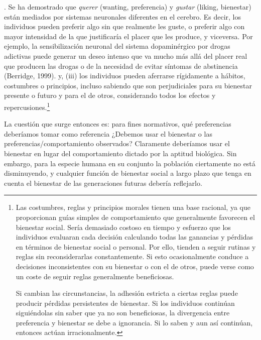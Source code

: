 \documentclass[10pt,a4paper]{article}
\newcounter{numitem}
\newenvironment{lnum}
      {\begin{list}{\arabic{numitem}.}{%
          \usecounter{numitem}%
          \setlength{\leftmargin}{1cm}%
          \setlength{\parskip}{3pt}%
          \setlength{\itemsep}{0pt}%
          \setlength{\parsep}{0pt}%
      }}
      {\end{list}}
\begin{document}
\begin{lnum}
{    Se ha demostrado que \textit{querer} (wanting, preferencia) y \textit{gustar} (liking, bienestar) están mediados por sistemas neuronales diferentes en el cerebro. Es decir, los individuos pueden preferir algo sin que realmente les guste, o preferir algo con mayor intensidad de la que justificaría el placer que les produce, y viceversa. Por ejemplo, la sensibilización neuronal del sistema dopaminérgico por drogas adictivas puede generar un deseo intenso que va mucho más allá del placer real que producen las drogas o de la necesidad de evitar síntomas de abstinencia (Berridge, 1999).
    } y, (iii) los individuos pueden aferrarse rígidamente a hábitos, costumbres o principios, incluso sabiendo que son perjudiciales para su bienestar presente o futuro y para el de otros, considerando todos los efectos y repercusiones.\footnote{%
        Las costumbres, reglas y principios morales tienen una base racional, ya que proporcionan guías simples de comportamiento que generalmente favorecen el bienestar social. Sería demasiado costoso en tiempo y esfuerzo que los individuos evaluaran cada decisión calculando todas las ganancias y pérdidas en términos de bienestar social o personal. Por ello, tienden a seguir rutinas y reglas sin reconsiderarlas constantemente. Si esto ocasionalmente conduce a decisiones inconsistentes con su bienestar o con el de otros, puede verse como un coste de seguir reglas generalmente beneficiosas.
    
    Si cambian las circunstancias, la adhesión estricta a ciertas reglas puede producir pérdidas persistentes de bienestar. Si los individuos continúan siguiéndolas sin saber que ya no son beneficiosas, la divergencia entre preferencia y bienestar se debe a ignorancia. Si lo saben y aun así continúan, entonces actúan irracionalmente.
    }
\end{lnum}

La cuestión que surge entonces es: para fines normativos, qué preferencias deberíamos tomar como referencia ¿Debemos usar el bienestar o las preferencias/comportamiento observados? Claramente deberíamos usar el bienestar en lugar del comportamiento dictado por la aptitud biológica. Sin embargo, para la especie humana en su conjunto la población ciertamente no está disminuyendo, y cualquier función de bienestar social a largo plazo que tenga en cuenta el bienestar de las generaciones futuras debería reflejarlo.





\clearpage
\end{document}
